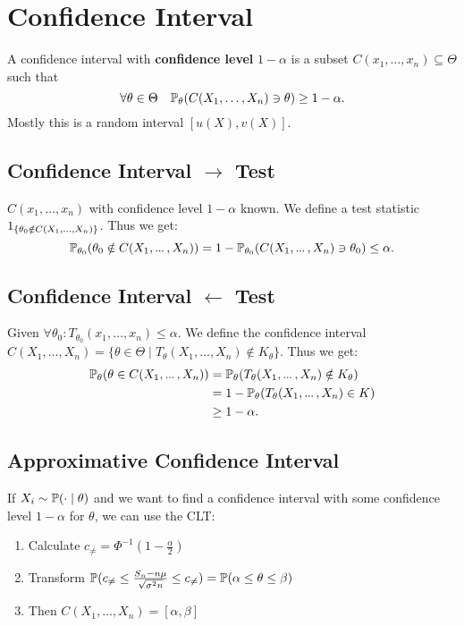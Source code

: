 \section{Confidence Interval}
\begin{definition*}
  A confidence interval with \textbf{confidence level} \(1 - \alpha\) is a subset \(C(x_1, \ldots, x_n) \subseteq \Theta\) such that
  \[\forall \theta \in \Theta \quad \P_\theta(C(X_1, \ldots, X_n) \ni \theta) \geq 1 - \alpha.\]
  Mostly this is a random interval \([u(X), v(X)]\).
\end{definition*}

\subsection*{Confidence Interval \(\to\) Test}
\(C(x_1, \ldots, x_n)\) with confidence level \(1 - \alpha\) known. We define a test statistic \(\I_{\{\theta_0 \notin C(X_1, \ldots, X_n)\}}\). Thus we get:
\[\P_{\theta_0}(\theta_0 \notin C(X_1, \sdots, X_n)) = 1 - \P_{\theta_0}(C(X_1, \sdots, X_n)\ni \theta_0) \leq \alpha.\]

\subsection*{Confidence Interval \(\leftarrow\) Test}
Given \(\forall \theta_0: T_{\theta_0}(x_1, \ldots, x_n) \leq \alpha\). We define the confidence interval \(C(X_1, \ldots, X_n) = \{\theta \in \Theta \mid T_\theta(X_1, \ldots, X_n) \notin K_\theta\}\). Thus we get:
\begin{align*}
  \P_\theta(\theta \in C(X_1, \sdots, X_n)) &= \P_\theta(T_\theta(X_1, \sdots, X_n) \notin K_\theta) \\
  &= 1 - \P_\theta(T_\theta(X_1, \sdots, X_n) \in K) \\
  &\geq 1 - \alpha.
\end{align*}

\subsection*{Approximative Confidence Interval}
If \(X_i \sim \P(\cdot \mid \theta)\) and we want to find a confidence interval with some confidence level \(1 - \alpha\) for \(\theta\), we can use the CLT:

\begin{enumerate}
  \item Calculate \(c_{\neq} = \Phi^{-1}\left(1 - \frac{\alpha}{2}\right)\)
  \item Transform \(\P(c_{\neq} \leq \frac{S_n - n \mu}{\sqrt{\sigma^2 n}} \leq c_{\neq}) = \P(\alpha \leq \theta \leq \beta)\)
  \item Then \(C(X_1, \ldots, X_n) = [\alpha, \beta]\)
\end{enumerate}

